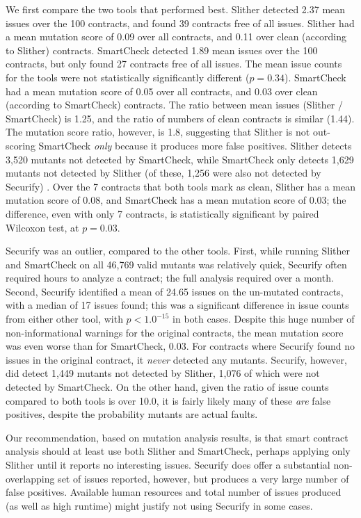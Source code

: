 We first compare the two tools that performed best.  Slither detected 2.37 mean issues over the 100 contracts, and found 39 contracts free of all issues.  Slither had a mean mutation score of 0.09 over all contracts, and 0.11 over clean (according to Slither) contracts.  SmartCheck detected 1.89 mean issues over the 100 contracts, but only found 27 contracts free of all issues.  The mean issue counts for the tools were not statistically significantly different ($p=0.34$).  SmartCheck had a mean mutation score of 0.05 over all contracts, and 0.03 over clean (according to SmartCheck) contracts.  The ratio between mean issues (Slither / SmartCheck) is 1.25, and the ratio of numbers of clean contracts is similar (1.44).  The mutation score ratio, however, is 1.8, suggesting that Slither is not out-scoring SmartCheck \emph{only} because it produces more false positives.  Slither detects 3,520 mutants not detected by SmartCheck, while SmartCheck only detects 1,629 mutants not detected by Slither (of these, 1,256 were also not detected by Securify) .  Over the 7 contracts that both tools mark as clean, Slither has a mean mutation score of 0.08, and SmartCheck has a mean mutation score of 0.03; the difference, even with only 7 contracts, is statistically significant by paired Wilcoxon test, at $p=0.03$.

Securify was an outlier, compared to the other tools.  First, while running Slither and SmartCheck on all 46,769 valid mutants was relatively quick, Securify often required hours to analyze a contract; the full analysis required over a month.  Second, Securify identified a mean of 24.65 issues on the un-mutated contracts, with a median of 17 issues found; this was a significant difference in issue counts from either other tool, with $p<1.0^{-15}$ in both cases.  Despite this huge number of non-informational warnings for the original contracts, the mean mutation score was even worse than for SmartCheck, 0.03.  For contracts where Securify found no issues in the original contract, it \emph{never} detected any mutants. Securify, however, did detect 1,449 mutants not detected by Slither, 1,076 of which were not detected by SmartCheck.  On the other hand, given the ratio of issue counts compared to both tools is over 10.0, it is fairly likely many of these \emph{are} false positives, despite the probability mutants are actual faults.

Our recommendation, based on mutation analysis results, is that smart contract analysis should at least use both Slither and SmartCheck, perhaps applying only Slither until it reports no interesting issues.  Securify does offer a substantial non-overlapping set of issues reported, however, but produces a very large number of false positives.  Available human resources and total number of issues produced (as well as high runtime) might justify not using Securify in some cases.

